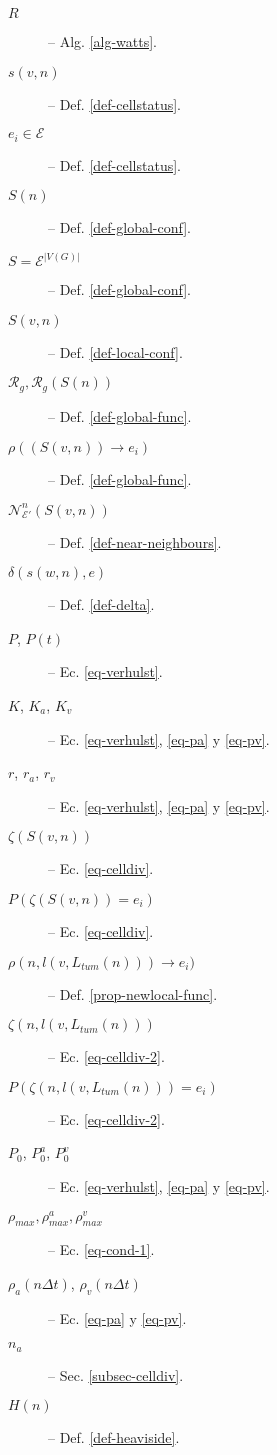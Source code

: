 \begin{minipage}[t]{0.45\textwidth}
\begin{description}
\item [$R$] -- Alg. \ref{alg-watts}. 
\item [$s(v,n)$] -- Def. \ref{def-cellstatus}.
\item [$e_i \in \mathcal{E}$] -- Def. \ref{def-cellstatus}.
\item [$S(n)$] -- Def. \ref{def-global-conf}. 
\item [$S=\mathcal{E}^{|V(G)|}$] -- Def. \ref{def-global-conf}.
\item [$S(v,n)$] -- Def. \ref{def-local-conf}.
\item [$\mathcal{R}_g,\mathcal{R}_g(S(n))$] -- Def. \ref{def-global-func}.
\item [$\rho((S(v,n)) \rightarrow e_i)$] -- Def. \ref{def-global-func}.
\item [$\mathcal{N}_{\mathcal{E'}}^n(S(v,n))$] -- Def. \ref{def-near-neighbours}. 
\item [$\delta(s(w,n),e)$] -- Def. \ref{def-delta}. 
\item [$P$, $P(t)$] -- Ec. \ref{eq-verhulst}. 
\item [$K$, $K_a$, $K_v$] -- Ec. \ref{eq-verhulst}, \ref{eq-pa} y \ref{eq-pv}.
\item [$r$, $r_a$, $r_v$] -- Ec. \ref{eq-verhulst}, \ref{eq-pa} y \ref{eq-pv}. 
\item [$\zeta(S(v,n))$] -- Ec. \ref{eq-celldiv}.
\item [$P(\zeta(S(v,n))=e_i)$] -- Ec. \ref{eq-celldiv}.
\item [$\rho(n,l(v,L_{tum}(n))) \rightarrow e_i)$] -- Def. \ref{prop-newlocal-func}.
\item [$\zeta(n,l(v,L_{tum}(n)))$] -- Ec. \ref{eq-celldiv-2}.
\item [$P(\zeta(n,l(v,L_{tum}(n)))=e_i)$] -- Ec. \ref{eq-celldiv-2}. 
\item [$P_0$, $P_0^a$, $P_0^v$] -- Ec. \ref{eq-verhulst}, \ref{eq-pa} y \ref{eq-pv}.
\item [$\rho_{max}, \rho_{max}^a, \rho_{max}^v$] -- Ec. \ref{eq-cond-1}.
\item [$\rho_a(n\Delta t)$, $\rho_v(n\Delta t)$] -- Ec. \ref{eq-pa} y \ref{eq-pv}.
\item [$n_a$] -- Sec. \ref{subsec-celldiv}.
\item [$H(n)$] -- Def. \ref{def-heaviside}.
\end{description}
\end{minipage}